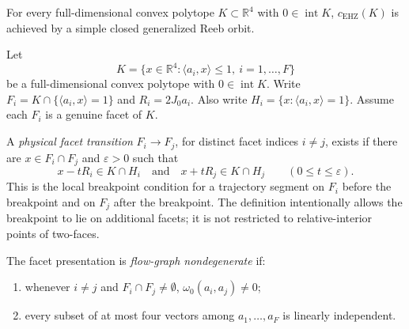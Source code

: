 %
%

\begin{unverified}
\begin{fact}\label{fact:fg-simple-capacity-minimizer}
For every full-dimensional convex polytope
\(K\subset\mathbb R^4\) with \(0\in\operatorname{int}K\),
\(c_{\mathrm{EHZ}}(K)\) is achieved by a simple closed generalized Reeb
orbit.
\end{fact}
\end{unverified}

\begin{unverified}
\begin{definition}%
\label{def:fg-nondegenerate-facet-presentation}
Let
\[
  K=\{x\in\mathbb R^4:\langle a_i,x\rangle\leq 1,
      \ i=1,\ldots,F\}
\]
be a full-dimensional convex polytope with \(0\in\operatorname{int}K\).
Write \(F_i=K\cap\{\langle a_i,x\rangle=1\}\) and
\(R_i=2J_0a_i\).
Also write \(H_i=\{x:\langle a_i,x\rangle=1\}\).
Assume each \(F_i\) is a genuine facet of \(K\).

A \emph{physical facet transition} \(F_i\to F_j\), for distinct facet indices
\(i\ne j\), exists if there are \(x\in F_i\cap F_j\) and
\(\varepsilon>0\) such that
\[
  x-tR_i\in K\cap H_i
  \quad\text{and}\quad
  x+tR_j\in K\cap H_j
  \qquad(0\le t\le\varepsilon).
\]
This is the local breakpoint condition for a trajectory segment on \(F_i\)
before the breakpoint and on \(F_j\) after the breakpoint.  The definition
intentionally allows the breakpoint to lie on additional facets; it is not
restricted to relative-interior points of two-faces.

The facet presentation is \emph{flow-graph nondegenerate} if:
\begin{enumerate}
\item whenever \(i\ne j\) and \(F_i\cap F_j\ne\emptyset\),
  \(\omega_0(a_i,a_j)\ne0\);
\item every subset of at most four vectors among
  \(a_1,\ldots,a_F\) is linearly independent.
\end{enumerate}
\end{definition}
\end{unverified}

